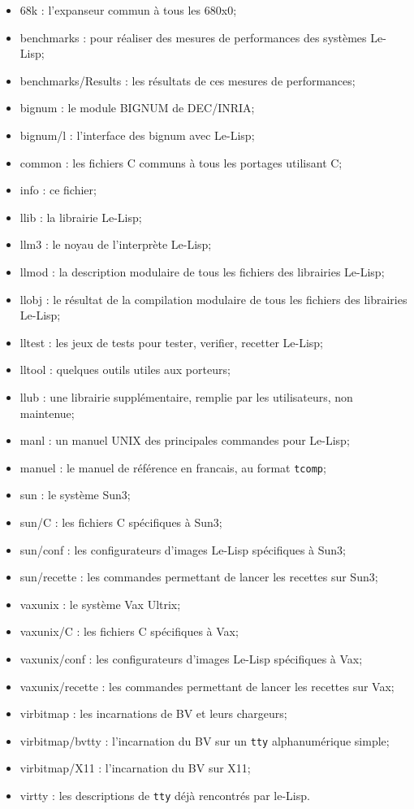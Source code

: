\begin {itemize}
\item   68k : l'expanseur commun \`{a} tous les 680x0;
\item   benchmarks : pour r\'{e}aliser des mesures de performances des syst\`{e}mes Le-Lisp;
\item   benchmarks/Results : les r\'{e}sultats de ces mesures de performances;
\item   bignum : le module BIGNUM de DEC/INRIA;
\item   bignum/l : l'interface des bignum avec Le-Lisp;
\item   common : les fichiers C communs \`{a} tous les portages utilisant C;
\item   info : ce fichier;
\item   llib : la librairie Le-Lisp;
\item   llm3 : le noyau de l'interpr\`{e}te Le-Lisp;
\item   llmod : la description modulaire de tous les fichiers des
librairies Le-Lisp;
\item   llobj : le r\'{e}sultat de la compilation modulaire de tous les
fichiers des librairies Le-Lisp;
\item   lltest : les jeux de tests pour tester, verifier, recetter Le-Lisp;
\item   lltool : quelques outils utiles aux porteurs;
\item   llub : une librairie suppl\'{e}mentaire, remplie par les
utilisateurs, non maintenue;
\item   manl : un manuel UNIX des principales commandes pour Le-Lisp;
\item   manuel : le manuel de r\'{e}f\'{e}rence en francais, au format {\tt tcomp};
\item   sun : le syst\`{e}me Sun3;
\item   sun/C : les fichiers C sp\'{e}cifiques \`{a} Sun3;
\item   sun/conf : les configurateurs d'images Le-Lisp sp\'{e}cifiques \`{a} Sun3;
\item   sun/recette : les commandes permettant de lancer les recettes
sur Sun3;
\item   vaxunix : le syst\`{e}me Vax Ultrix;
\item   vaxunix/C : les fichiers C sp\'{e}cifiques \`{a} Vax;
\item   vaxunix/conf : les configurateurs d'images Le-Lisp sp\'{e}cifiques \`{a} Vax;
\item   vaxunix/recette : les commandes permettant de lancer les recettes
sur Vax; 
\item   virbitmap : les incarnations de BV et leurs chargeurs;
\item   virbitmap/bvtty : l'incarnation du BV sur un {\tt tty}
alphanum\'{e}rique simple;
\item   virbitmap/X11 : l'incarnation du BV sur X11;
\item   virtty : les descriptions de {\tt tty} d\'{e}j\`{a} rencontr\'{e}s par
le-Lisp. 
\end {itemize}

